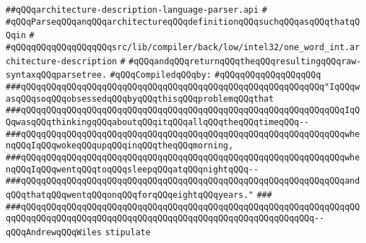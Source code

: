 \label{src/lib/compiler/back/low/tools/parser/architecture-description-language-parser.api}
\verb|##qQQqarchitecture-description-language-parser.api|\newline
\verb|#|\newline
\verb|#qQQqParseqQQqanqQQqarchitectureqQQqdefinitionqQQqsuchqQQqasqQQqthatqQQqin|\newline
\verb|#|\newline
\verb|#qQQqqQQqqQQqqQQqqQQqsrc/lib/compiler/back/low/intel32/one_word_int.architecture-description|\newline
\verb|#|\newline
\verb|#qQQqandqQQqreturnqQQqtheqQQqresultingqQQqraw-syntaxqQQqparsetree.|\newline
\newline
\verb|#qQQqCompiledqQQqby:|\newline
\verb|#qQQqqQQqqQQqqQQqqQQq|\newline
\newline
\newline
\newline
\newline
\verb|###qQQqqQQqqQQqqQQqqQQqqQQqqQQqqQQqqQQqqQQqqQQqqQQqqQQqqQQqqQQq"IqQQqwasqQQqsoqQQqobsessedqQQqbyqQQqthisqQQqproblemqQQqthat|\newline
\verb|###qQQqqQQqqQQqqQQqqQQqqQQqqQQqqQQqqQQqqQQqqQQqqQQqqQQqqQQqqQQqqQQqIqQQqwasqQQqthinkingqQQqaboutqQQqitqQQqallqQQqtheqQQqtimeqQQq--|\newline
\verb|###qQQqqQQqqQQqqQQqqQQqqQQqqQQqqQQqqQQqqQQqqQQqqQQqqQQqqQQqqQQqqQQqwhenqQQqIqQQqwokeqQQqupqQQqinqQQqtheqQQqmorning,|\newline
\verb|###qQQqqQQqqQQqqQQqqQQqqQQqqQQqqQQqqQQqqQQqqQQqqQQqqQQqqQQqqQQqqQQqwhenqQQqIqQQqwentqQQqtoqQQqsleepqQQqatqQQqnightqQQq--|\newline
\verb|###qQQqqQQqqQQqqQQqqQQqqQQqqQQqqQQqqQQqqQQqqQQqqQQqqQQqqQQqqQQqqQQqandqQQqthatqQQqwentqQQqonqQQqforqQQqeightqQQqyears."|\newline
\verb|###|\newline
\verb|###qQQqqQQqqQQqqQQqqQQqqQQqqQQqqQQqqQQqqQQqqQQqqQQqqQQqqQQqqQQqqQQqqQQqqQQqqQQqqQQqqQQqqQQqqQQqqQQqqQQqqQQqqQQqqQQqqQQqqQQqqQQqqQQq--qQQqAndrewqQQqWiles|\newline
\newline
\newline
\verb|stipulate|\newline
